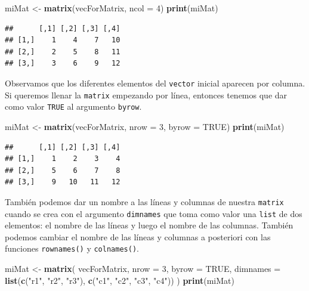 \documentclass[
]{book}
\newenvironment{Shaded}{\begin{snugshade}}{\end{snugshade}}
\newcommand{\DataTypeTok}[1]{\textcolor[rgb]{0.13,0.29,0.53}{#1}}
\newcommand{\DecValTok}[1]{\textcolor[rgb]{0.00,0.00,0.81}{#1}}
\newcommand{\KeywordTok}[1]{\textcolor[rgb]{0.13,0.29,0.53}{\textbf{#1}}}
\newcommand{\NormalTok}[1]{#1}
\newcommand{\OtherTok}[1]{\textcolor[rgb]{0.56,0.35,0.01}{#1}}
\newcommand{\StringTok}[1]{\textcolor[rgb]{0.31,0.60,0.02}{#1}}
\begin{document}
\begin{Shaded}
\begin{Highlighting}[]
\NormalTok{miMat <-}\StringTok{ }\KeywordTok{matrix}\NormalTok{(vecForMatrix, }\DataTypeTok{ncol =} \DecValTok{4}\NormalTok{)}
\KeywordTok{print}\NormalTok{(miMat)}
\end{Highlighting}
\end{Shaded}

\begin{verbatim}
##      [,1] [,2] [,3] [,4]
## [1,]    1    4    7   10
## [2,]    2    5    8   11
## [3,]    3    6    9   12
\end{verbatim}

Observamos que los diferentes elementos del \texttt{vector} inicial aparecen por columna. Si queremos llenar la \texttt{matrix} empezando por línea, entonces tenemos que dar como valor \texttt{TRUE} al argumento \texttt{byrow}.

\begin{Shaded}
\begin{Highlighting}[]
\NormalTok{miMat <-}\StringTok{ }\KeywordTok{matrix}\NormalTok{(vecForMatrix, }\DataTypeTok{nrow =} \DecValTok{3}\NormalTok{, }\DataTypeTok{byrow =} \OtherTok{TRUE}\NormalTok{)}
\KeywordTok{print}\NormalTok{(miMat)}
\end{Highlighting}
\end{Shaded}

\begin{verbatim}
##      [,1] [,2] [,3] [,4]
## [1,]    1    2    3    4
## [2,]    5    6    7    8
## [3,]    9   10   11   12
\end{verbatim}

También podemos dar un nombre a las líneas y columnas de nuestra \texttt{matrix} cuando se crea con el argumento \texttt{dimnames} que toma como valor una \texttt{list} de dos elementos: el nombre de las líneas y luego el nombre de las columnas. También podemos cambiar el nombre de las líneas y columnas a posteriori con las funciones \texttt{rownames()} y \texttt{colnames()}.

\begin{Shaded}
\begin{Highlighting}[]
\NormalTok{miMat <-}\StringTok{ }\KeywordTok{matrix}\NormalTok{(}
\NormalTok{  vecForMatrix, }
  \DataTypeTok{nrow =} \DecValTok{3}\NormalTok{, }
  \DataTypeTok{byrow =} \OtherTok{TRUE}\NormalTok{, }
  \DataTypeTok{dimnames =} \KeywordTok{list}\NormalTok{(}\KeywordTok{c}\NormalTok{(}\StringTok{"r1"}\NormalTok{, }\StringTok{"r2"}\NormalTok{, }\StringTok{"r3"}\NormalTok{), }\KeywordTok{c}\NormalTok{(}\StringTok{"c1"}\NormalTok{, }\StringTok{"c2"}\NormalTok{, }\StringTok{"c3"}\NormalTok{, }\StringTok{"c4"}\NormalTok{))}
\NormalTok{)}
\KeywordTok{print}\NormalTok{(miMat)}
\end{Highlighting}
\end{Shaded}
\end{document}
